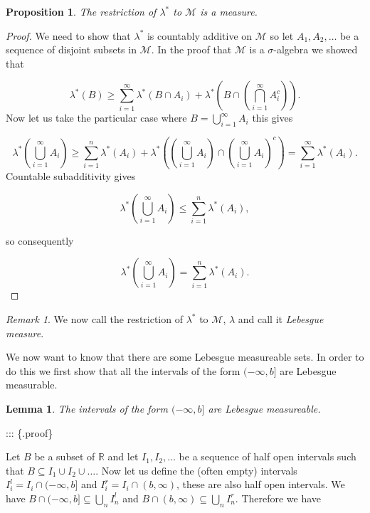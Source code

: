 \documentclass[
]{book}
\newtheorem{lemma}{Lemma}[chapter]
\newtheorem{proposition}{Proposition}[chapter]
\theoremstyle{definition}
\theoremstyle{definition}
\theoremstyle{definition}
\theoremstyle{definition}
\theoremstyle{remark}
\newtheorem*{remark}{Remark}
\begin{document}
\begin{proposition}
The restriction of \(\lambda^*\) to \(\mathscr{M}\) is a measure.
\end{proposition}

\begin{proof}
We need to show that \(\lambda^*\) is countably additive on \(\mathscr{M}\) so let \(A_1, A_2, \dots\) be a sequence of disjoint subsets in \(\mathscr{M}\). In the proof that \(\mathscr{M}\) is a \(\sigma\)-algebra we showed that

\[ \lambda^*(B) \geq \sum_{i=1}^\infty \lambda^*(B \cap A_i) + \lambda^* \left( B \cap \left( \bigcap_{i=1}^\infty A_i^c \right) \right). \]
Now let us take the particular case where \(B = \bigcup_{i=1}^\infty A_i\) this gives

\[ \lambda^* \left( \bigcup_{i=1}^\infty A_i \right) \geq \sum_{i=1}^n \lambda^*(A_i) + \lambda^* \left(\left( \bigcup_{i=1}^\infty A_i \right) \cap \left( \bigcup_{i=1}^\infty A_i \right)^c \right) = \sum_{i=1}^\infty \lambda^* (A_i). \]
Countable subadditivity gives

\[ \lambda^* \left( \bigcup_{i=1}^\infty A_i \right) \leq \sum_{i=1}^n \lambda^*(A_i),  \]

so consequently

\[ \lambda^* \left( \bigcup_{i=1}^\infty A_i \right) = \sum_{i=1}^n \lambda^*(A_i).  \]
\end{proof}

\begin{remark}
We now call the restriction of \(\lambda^*\) to \(\mathscr{M}\), \(\lambda\) and call it \emph{Lebesgue measure}.
\end{remark}

We now want to know that there are some Lebesgue measureable sets. In order to do this we first show that all the intervals of the form \((-\infty, b]\) are Lebesgue measurable.

\begin{lemma}
The intervals of the form \((-\infty, b]\) are Lebesgue measureable.
\end{lemma}

::: \{.proof\}

Let \(B\) be a subset of \(\mathbb{R}\) and let \(I_1, I_2, \dots\) be a sequence of half open intervals such that \(B \subseteq I_1 \cup I_2 \cup \dots\). Now let us define the (often empty) intervals \(I^l_i = I_i \cap (-\infty, b]\) and \(I^r_i = I_i \cap (b, \infty)\), these are also half open intervals. We have \(B \cap (-\infty,b] \subseteq \bigcup_n I^l_n\) and \(B \cap (b,\infty) \subseteq \bigcup_n I^r_n\). Therefore we have
\end{document}
